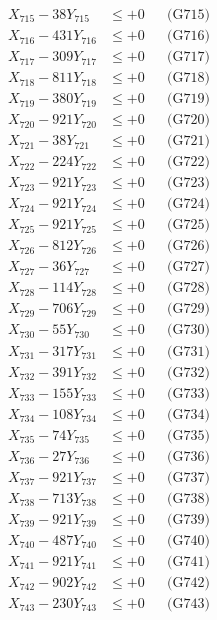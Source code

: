 \documentclass[a4paper,10pt]{article}
\begin{document}
{\begin{align}
X_{715} - 38Y_{715} &\leq +0 && \text{(G715)} \\
X_{716} - 431Y_{716} &\leq +0 && \text{(G716)} \\
X_{717} - 309Y_{717} &\leq +0 && \text{(G717)} \\
X_{718} - 811Y_{718} &\leq +0 && \text{(G718)} \\
X_{719} - 380Y_{719} &\leq +0 && \text{(G719)} \\
X_{720} - 921Y_{720} &\leq +0 && \text{(G720)} \\
\allowbreak
X_{721} - 38Y_{721} &\leq +0 && \text{(G721)} \\
X_{722} - 224Y_{722} &\leq +0 && \text{(G722)} \\
X_{723} - 921Y_{723} &\leq +0 && \text{(G723)} \\
X_{724} - 921Y_{724} &\leq +0 && \text{(G724)} \\
X_{725} - 921Y_{725} &\leq +0 && \text{(G725)} \\
X_{726} - 812Y_{726} &\leq +0 && \text{(G726)} \\
X_{727} - 36Y_{727} &\leq +0 && \text{(G727)} \\
X_{728} - 114Y_{728} &\leq +0 && \text{(G728)} \\
X_{729} - 706Y_{729} &\leq +0 && \text{(G729)} \\
X_{730} - 55Y_{730} &\leq +0 && \text{(G730)} \\
\allowbreak
X_{731} - 317Y_{731} &\leq +0 && \text{(G731)} \\
X_{732} - 391Y_{732} &\leq +0 && \text{(G732)} \\
X_{733} - 155Y_{733} &\leq +0 && \text{(G733)} \\
X_{734} - 108Y_{734} &\leq +0 && \text{(G734)} \\
X_{735} - 74Y_{735} &\leq +0 && \text{(G735)} \\
X_{736} - 27Y_{736} &\leq +0 && \text{(G736)} \\
X_{737} - 921Y_{737} &\leq +0 && \text{(G737)} \\
X_{738} - 713Y_{738} &\leq +0 && \text{(G738)} \\
X_{739} - 921Y_{739} &\leq +0 && \text{(G739)} \\
X_{740} - 487Y_{740} &\leq +0 && \text{(G740)} \\
\allowbreak
X_{741} - 921Y_{741} &\leq +0 && \text{(G741)} \\
X_{742} - 902Y_{742} &\leq +0 && \text{(G742)} \\
X_{743} - 230Y_{743} &\leq +0 && \text{(G743)} \\

\end{align}}
\end{document}
